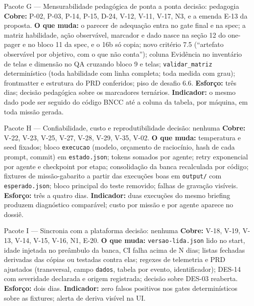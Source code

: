 \documentclass[11pt,a4paper]{article}
\begin{document}
\begin{achadobox}{Pacote G --- Mensurabilidade pedagógica de ponta a ponta \hfill decisão: pedagogia}
\textbf{Cobre:} P-02, P-03, P-14, P-15, D-24, V-12, V-11, V-17, N3, e a emenda E-13 da proposta.
\textbf{O que muda:} o parecer de adequação entra no gate final e na spec; a matriz habilidade,
ação observável, marcador e dado nasce na seção 12 do one-pager e no bloco 11 da spec, e o 16b só
copia; novo critério 7.5 (``artefato observável por objetivo, com o que não conta''); coluna
Evidência no inventário de telas e dimensão no QA cruzando bloco 9 e telas; \texttt{validar\_matriz}
determinístico (toda habilidade com linha completa; toda medida com grau); frontmatter e estrutura do
PRD conferidos; piso de desafio 6.6.
\textbf{Esforço:} três dias; decisão pedagógica sobre os marcadores ternários.
\textbf{Indicador:} o mesmo dado pode ser seguido do código BNCC até a coluna da tabela, por máquina,
em toda missão gerada.
\end{achadobox}

\begin{achadobox}{Pacote H --- Confiabilidade, custo e reprodutibilidade \hfill decisão: nenhuma}
\textbf{Cobre:} V-22, V-23, V-25, V-27, V-28, V-29, V-35, V-02.
\textbf{O que muda:} temperatura e seed fixados; bloco \texttt{execucao} (modelo, orçamento de
raciocínio, hash de cada prompt, commit) em \texttt{estado.json}; tokens somados por agente; retry
exponencial por agente e checkpoint por etapa; consolidação da banca recalculada por código;
fixtures de missão-gabarito a partir das execuções boas em \texttt{output/} com \texttt{esperado.json};
bloco principal do teste removido; falhas de gravação visíveis.
\textbf{Esforço:} três a quatro dias.
\textbf{Indicador:} duas execuções do mesmo briefing produzem diagnóstico comparável; custo por
missão e por agente aparece no dossiê.
\end{achadobox}

\begin{achadobox}{Pacote I --- Sincronia com a plataforma \hfill decisão: nenhuma}
\textbf{Cobre:} V-18, V-19, V-13, V-14, V-15, V-16, N1, E-20.
\textbf{O que muda:} \texttt{versao-lida.json} lido no start, idade injetada no preâmbulo da banca,
CI falha acima de N dias; listas fechadas derivadas das cópias ou testadas contra elas; regexes de
telemetria e PRD ajustados (transversal, campo \texttt{dados}, tabela por evento, identificador);
DES-14 com severidade declarada e origem registrada; decisão sobre DES-03 reaberta.
\textbf{Esforço:} dois dias.
\textbf{Indicador:} zero falsos positivos nos gates determinísticos sobre as fixtures; alerta de
deriva visível na UI.
\end{achadobox}
\end{document}
